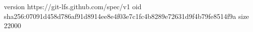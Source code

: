 version https://git-lfs.github.com/spec/v1
oid sha256:07091d458d786af91d8914ee8e4f03e7c1fc4b8289e72631d9f4b79fe8514f9a
size 22000
